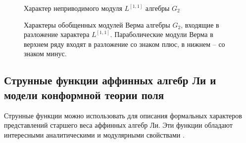 \begin{figure}[h]
  \noindent{}
  \caption{Характер неприводимого модуля  $L^{[1,1]}$ алгебры $G_{2}$}
  \label{branching-bgg}
\end{figure}
\begin{figure}[h]
  \noindent{}
  \caption{Характеры обобщенных модулей Верма алгебры $G_{2}$, входящие в разложение характера $L^{[1,1]}$. Параболические модули Верма в верхнем ряду входят в разложение со знаком плюс, в нижнем -- со знаком минус.}
  \label{g2-pverma}
\end{figure}

\subsection{Струнные функции аффинных алгебр Ли и модели конформной теории поля}
\label{sec:string-funct-affine}
Струнные функции можно использовать для описания формальных характеров представлений старшего веса аффинных алгебр Ли. Эти функции обладают интересными аналитическими и модулярными свойствами \cite{kac1990idl,kac1988modular,kac1984infinite}.

